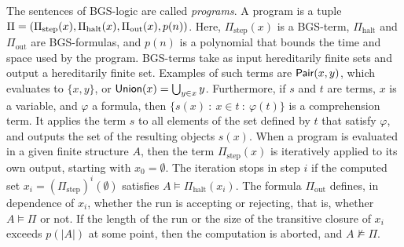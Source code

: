 \documentclass[10pt,a4paper]{article}
\renewcommand{\phi}{\varphi}
\renewcommand{\phi}{\varphi}
\newcommand{\Pair}{\textsf{\upshape Pair}}
\newcommand{\Union}{\textsf{\upshape Union}}
\begin{document}
	The sentences of BGS-logic are called \emph{programs}. A program is a tuple $\Pi = (\Pi_{\text{step}}(x),\\ \Pi_{\text{halt}}(x),\Pi_{\text{out}}(x),p(n))$. Here, $\Pi_{\text{step}}(x)$ is a BGS-term, $\Pi_{\text{halt}}$ and $\Pi_{\text{out}}$ are BGS-formulas, and $p(n)$ is a polynomial that bounds the time and space used by the program. BGS-terms take as input hereditarily finite sets and output a hereditarily finite set. Examples of such terms are $\Pair(x,y)$, which evaluates to $\{x,y\}$, or $\Union(x) = \bigcup_{y \in x} y$. Furthermore, if $s$ and $t$ are terms, $x$ is a variable, and $\phi$ a formula, then $\{ s(x) \ : \ x \in t \ : \ \phi(t) \}$ is a comprehension term. It applies the term $s$ to all elements of the set defined by $t$ that satisfy $\phi$, and outputs the set of the resulting objects $s(x)$. When a program is evaluated in a given finite structure $A$, then the term $\Pi_{\text{step}}(x)$ is iteratively applied to its own output, starting with $x_0 = \emptyset$. The iteration stops in step $i$ if the computed set $x_i = (\Pi_{\text{step}})^i(\emptyset)$ satisfies $A \models \Pi_{\text{halt}}(x_i)$. The formula $\Pi_{\text{out}}$ defines, in dependence of $x_i$, whether the run is accepting or rejecting, that is, whether $A \models \Pi$ or not. If the length of the run or the size of the transitive closure of $x_i$ exceeds $p(|A|)$ at some point, then the computation is aborted, and $A \not\models \Pi$.\\
	
\end{document}
